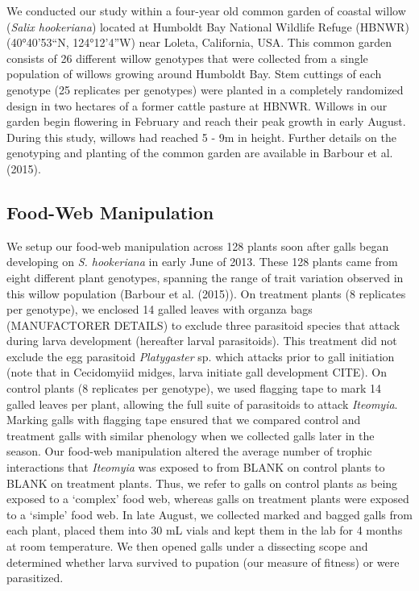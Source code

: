 \documentclass[]{elsarticle} %
\begin{document}
We conducted our study within a four-year old common garden of coastal
willow (\emph{Salix hookeriana}) located at Humboldt Bay National
Wildlife Refuge (HBNWR) (40°40'53``N, 124°12'4''W) near Loleta,
California, USA. This common garden consists of 26 different willow
genotypes that were collected from a single population of willows
growing around Humboldt Bay. Stem cuttings of each genotype (25
replicates per genotypes) were planted in a completely randomized design
in two hectares of a former cattle pasture at HBNWR. Willows in our
garden begin flowering in February and reach their peak growth in early
August. During this study, willows had reached 5 - 9m in height. Further
details on the genotyping and planting of the common garden are
available in Barbour et al. (2015).

\subsection{Food-Web Manipulation}\label{food-web-manipulation}

We setup our food-web manipulation across 128 plants soon after galls
began developing on \emph{S. hookeriana} in early June of 2013. These
128 plants came from eight different plant genotypes, spanning the range
of trait variation observed in this willow population (Barbour et al.
(2015)). On treatment plants (8 replicates per genotype), we enclosed 14
galled leaves with organza bags (MANUFACTORER DETAILS) to exclude three
parasitoid species that attack during larva development (hereafter
larval parasitoids). This treatment did not exclude the egg parasitoid
\emph{Platygaster} sp. which attacks prior to gall initiation (note that
in Cecidomyiid midges, larva initiate gall development CITE). On control
plants (8 replicates per genotype), we used flagging tape to mark 14
galled leaves per plant, allowing the full suite of parasitoids to
attack \emph{Iteomyia}. Marking galls with flagging tape ensured that we
compared control and treatment galls with similar phenology when we
collected galls later in the season. Our food-web manipulation altered
the average number of trophic interactions that \emph{Iteomyia} was
exposed to from BLANK on control plants to BLANK on treatment plants.
Thus, we refer to galls on control plants as being exposed to a
`complex' food web, whereas galls on treatment plants were exposed to a
`simple' food web. In late August, we collected marked and bagged galls
from each plant, placed them into 30 mL vials and kept them in the lab
for 4 months at room temperature. We then opened galls under a
dissecting scope and determined whether larva survived to pupation (our
measure of fitness) or were parasitized.
\end{document}
